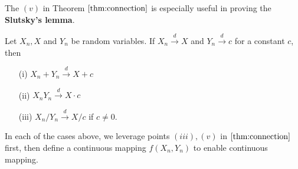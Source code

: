 \documentclass{article}
\begin{document}
The $(v)$ in Theorem $\ref{thm:connection}$ is especially useful in proving the \textbf{Slutsky's lemma}.
\begin{lemma}
    Let $X_n, X$ and $Y_n$ be random variables. If $X_n \xrightarrow{d} X$ and $Y_n \xrightarrow{d} c$ for a constant $c$, then
    \begin{enumerate}
        \item[(i)] $X_n + Y_n \xrightarrow{d} X + c$
        \item[(ii)] $X_n Y_n \xrightarrow{d} X \cdot c$
        \item[(iii)] $X_n / Y_n \xrightarrow{d} X / c$ if $c \neq 0$.
    \end{enumerate}
\end{lemma}
In each of the cases above, we leverage points $(iii), (v)$ in $\ref{thm:connection}$ first, then define a continuous mapping $f(X_n, Y_n)$ to enable continuous mapping.
\end{document}
